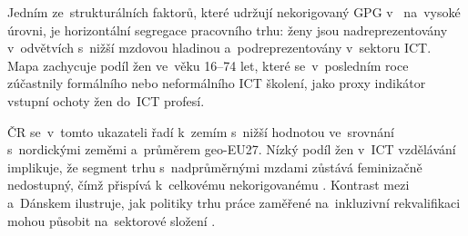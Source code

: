 Jedním ze~strukturálních faktorů, které udržují nekorigovaný \ac{GPG} v~ na~vysoké úrovni, je horizontální segregace pracovního trhu: ženy jsou nadreprezentovány v~odvětvích s~nižší mzdovou hladinou a~podreprezentovány v~sektoru \acs{ICT}. Mapa zachycuje podíl žen ve~věku 16--74 let, které se~v~posledním roce zúčastnily formálního nebo neformálního \acs{ICT} školení, jako proxy indikátor vstupní ochoty žen do~\acs{ICT} profesí.

\Ac{ČR} se~v~tomto ukazateli řadí k~zemím s~nižší hodnotou ve~srovnání s~nordickými zeměmi a~průměrem \acs{geo-EU27}. Nízký podíl žen v~\acs{ICT} vzdělávání implikuje, že segment trhu s~nadprůměrnými mzdami zůstává feminizačně nedostupný, čímž přispívá k~celkovému nekorigovanému . Kontrast mezi  a~Dánskem ilustruje, jak politiky trhu práce zaměřené na~inkluzivní rekvalifikaci mohou působit na~sektorové složení .

